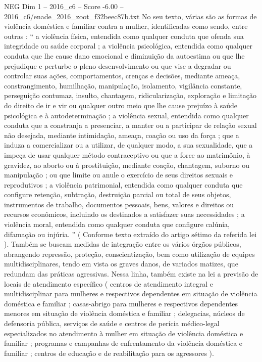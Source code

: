 \begin{textsample}{NEG Dim 1 – 2016\_c6 – Score -6.00 – 2016\_c6/enade\_2016\_zoot\_f32beec87b.txt}
No seu texto, várias são as formas de violência doméstica e familiar contra a mulher, identificadas como sendo, entre outras : “ a violência física, entendida como qualquer conduta que ofenda sua integridade ou saúde corporal ; a violência psicológica, entendida como qualquer conduta que lhe cause dano emocional e diminuição da autoestima ou que lhe prejudique e perturbe o pleno desenvolvimento ou que vise a degradar ou controlar suas ações, comportamentos, crenças e decisões, mediante ameaça, constrangimento, humilhação, manipulação, isolamento, vigilância constante, perseguição contumaz, insulto, chantagem, ridicularização, exploração e limitação do direito de ir e vir ou qualquer outro meio que lhe cause prejuízo à saúde psicológica e à autodeterminação ; a violência sexual, entendida como qualquer conduta que a constranja a presenciar, a manter ou a participar de relação sexual não desejada, mediante intimidação, ameaça, coação ou uso da força ; que a induza a comercializar ou a utilizar, de qualquer modo, a sua sexualidade, que a impeça de usar qualquer método contraceptivo ou que a force ao matrimônio, à gravidez, ao aborto ou à prostituição, mediante coação, chantagem, suborno ou manipulação ; ou que limite ou anule o exercício de seus direitos sexuais e reprodutivos ; a violência patrimonial, entendida como qualquer conduta que configure retenção, subtração, destruição parcial ou total de seus objetos, instrumentos de trabalho, documentos pessoais, bens, valores e direitos ou recursos econômicos, incluindo os destinados a satisfazer suas necessidades ; a violência moral, entendida como qualquer conduta que configure calúnia, difamação ou injúria. ” ( Conforme texto extraído do artigo sétimo da referida lei ).
Também se buscam medidas de integração entre os vários órgãos públicos, abrangendo repressão, proteção, conscientização, bem como utilização de equipes multidisciplinares, tendo em vista os graves danos, de variados matizes, que redundam das práticas agressivas.
Nessa linha, também existe na lei a previsão de locais de atendimento específico ( centros de atendimento integral e multidisciplinar para mulheres e respectivos dependentes em situação de violência doméstica e familiar ; casas-abrigo para mulheres e respectivos dependentes menores em situação de violência doméstica e familiar ; delegacias, núcleos de defensoria pública, serviços de saúde e centros de perícia médico-legal especializados no atendimento à mulher em situação de violência doméstica e familiar ; programas e campanhas de enfrentamento da violência doméstica e familiar ; centros de educação e de reabilitação para os agressores ).

\end{textsample}
